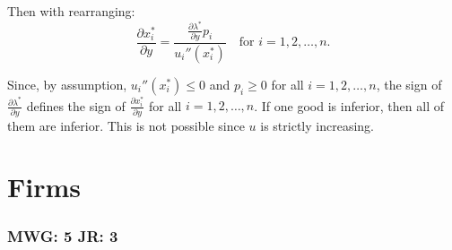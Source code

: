 \documentclass{article}
\begin{document}
\begin{enumerate}
            Then with rearranging:
            \[
            \frac{\partial x_i^*}{\partial y} = \frac{\frac{\partial \lambda^*}{\partial y} p_i}{u_i''(x_i^*)} \quad \text{for } i = 1, 2, \ldots, n.
            \]
            
            Since, by assumption, \(u_i''(x_i^*) \leq 0\) and \(p_i \geq 0\) for all \(i = 1, 2, \ldots, n\), the sign of \(\frac{\partial \lambda^*}{\partial y}\) defines the sign of \(\frac{\partial x_i^*}{\partial y}\) for all \(i = 1, 2, \ldots, n\). If one good is inferior, then all of them are inferior. This is not possible since \(u\) is strictly increasing.
\end{enumerate}

\newpage
\section{Firms}
\subsubsection*{MWG: 5 JR: 3}
\end{document}
